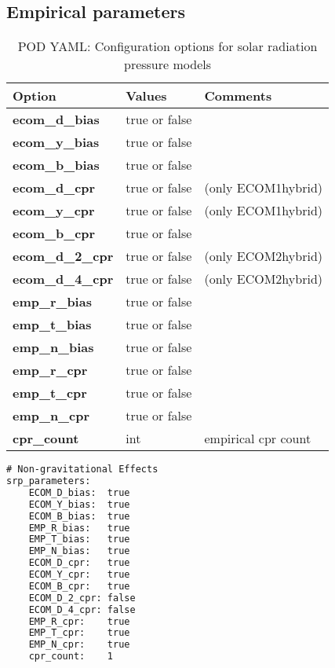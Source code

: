 \subsection{Empirical parameters}
\begin{table}[h!]
	\begin{tabular}{|p{4.5cm}|p{2cm}|p{3.5cm}|}
		\hline
		Option & Values & Comments \\
		\hline
		\textbf{ecom\_d\_bias} & true or false & \\ 
		\textbf{ecom\_y\_bias} & true or false & \\ 
		\textbf{ecom\_b\_bias} & true or false & \\ 
		\textbf{ecom\_d\_cpr} & true or false & (only ECOM1\/hybrid)\\ 
		\textbf{ecom\_y\_cpr} & true or false & (only ECOM1\/hybrid)\\ 
		\textbf{ecom\_b\_cpr} & true or false & \\
		\textbf{ecom\_d\_2\_cpr} & true or false &  (only ECOM2\/hybrid)\\ 
		\textbf{ecom\_d\_4\_cpr} & true or false & (only ECOM2\/hybrid) \\
		\textbf{emp\_r\_bias} & true or false & \\
		\textbf{emp\_t\_bias} & true or false & \\ 
		\textbf{emp\_n\_bias}  & true or false & \\
		\textbf{emp\_r\_cpr}  & true or false & \\
		\textbf{emp\_t\_cpr}  & true or false & \\
		\textbf{emp\_n\_cpr} & true or false & \\
		\textbf{cpr\_count}  & int & empirical cpr count \\
		\hline
	\end{tabular}
	\caption{POD YAML: Configuration options for solar radiation pressure models}
	\label{table:pod_yaml_srp_options}
\end{table}
%
\begin{lstlisting}[language=xml,caption=yaml example for srp parameters]
# Non-gravitational Effects
srp_parameters:
	ECOM_D_bias:  true
	ECOM_Y_bias:  true
	ECOM_B_bias:  true
	EMP_R_bias:   true
	EMP_T_bias:   true
	EMP_N_bias:   true
	ECOM_D_cpr:   true
	ECOM_Y_cpr:   true
	ECOM_B_cpr:   true
	ECOM_D_2_cpr: false
	ECOM_D_4_cpr: false
	EMP_R_cpr:    true
	EMP_T_cpr:    true
	EMP_N_cpr:    true
	cpr_count:    1
\end{lstlisting}



